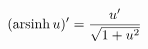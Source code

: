 \documentclass[preview]{standalone}
\begin{document}
\begin{align*}
\special{dvisvgm:raw <g id='unique000'>}(\operatorname{arsinh} u)'=\dfrac{u'}{\sqrt{1+u^2}}\special{dvisvgm:raw </g>}
\end{align*}
\end{document}
